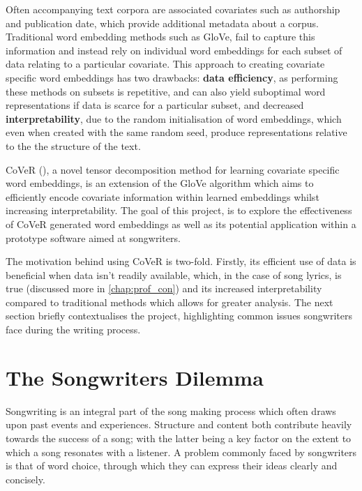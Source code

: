 \noindent
\newline
Often accompanying text corpora are associated covariates such as authorship and publication date, which provide additional metadata about a corpus. Traditional word embedding methods such as GloVe, fail to capture this information and instead rely on individual word embeddings for each subset of data relating to a particular covariate. This approach to creating covariate specific word embeddings has two drawbacks: \textbf{data efficiency}, as performing these methods on subsets is repetitive, and can also yield suboptimal word representations if data is scarce for a particular subset, and decreased \textbf{interpretability}, due to the random initialisation of word embeddings, which even when created with the same random seed, produce representations relative to the the structure of the text. 

\noindent
\newline
CoVeR (\cite{Tian2018}), a novel tensor decomposition method for learning covariate specific word embeddings, is an extension of the GloVe algorithm which aims to efficiently encode covariate information within learned embeddings whilst increasing interpretability. The goal of this project, is to explore the effectiveness of CoVeR generated word embeddings as well as its potential application within a prototype software aimed at songwriters. 

\noindent
\newline
The motivation behind using CoVeR is two-fold. Firstly, its efficient use of data is beneficial when data isn't readily available, which, in the case of song lyrics, is true (discussed more in \autoref{chap:prof_con}) and its increased interpretability compared to traditional methods which allows for greater analysis. The next section briefly contextualises the project, highlighting common issues songwriters face during the writing process.

\section{The Songwriters Dilemma}
Songwriting is an integral part of the song making process which often draws upon past events and experiences. Structure and content both contribute heavily towards the success of a song; with the latter being a key factor on the extent to which a song resonates with a listener. A problem commonly faced by songwriters is that of word choice, through which they can express their ideas clearly and concisely.

